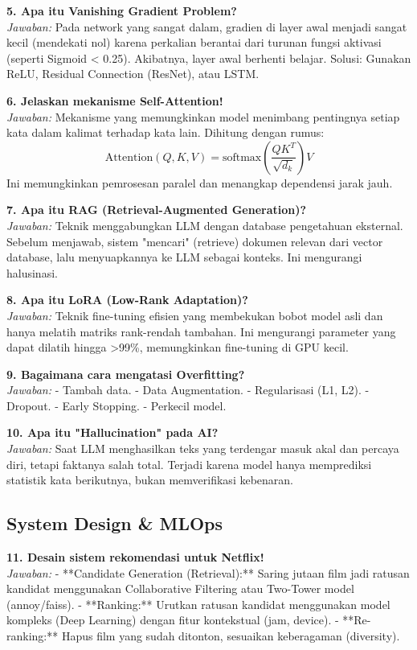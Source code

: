 \textbf{5. Apa itu Vanishing Gradient Problem?} \\
\textit{Jawaban:} Pada network yang sangat dalam, gradien di layer awal menjadi sangat kecil (mendekati nol) karena perkalian berantai dari turunan fungsi aktivasi (seperti Sigmoid < 0.25). Akibatnya, layer awal berhenti belajar. Solusi: Gunakan ReLU, Residual Connection (ResNet), atau LSTM.

\textbf{6. Jelaskan mekanisme Self-Attention!} \\
\textit{Jawaban:} Mekanisme yang memungkinkan model menimbang pentingnya setiap kata dalam kalimat terhadap kata lain. Dihitung dengan rumus:
\[ \text{Attention}(Q, K, V) = \text{softmax}\left(\frac{QK^T}{\sqrt{d_k}}\right)V \]
Ini memungkinkan pemrosesan paralel dan menangkap dependensi jarak jauh.

\textbf{7. Apa itu RAG (Retrieval-Augmented Generation)?} \\
\textit{Jawaban:} Teknik menggabungkan LLM dengan database pengetahuan eksternal. Sebelum menjawab, sistem "mencari" (retrieve) dokumen relevan dari vector database, lalu menyuapkannya ke LLM sebagai konteks. Ini mengurangi halusinasi.

\textbf{8. Apa itu LoRA (Low-Rank Adaptation)?} \\
\textit{Jawaban:} Teknik fine-tuning efisien yang membekukan bobot model asli dan hanya melatih matriks rank-rendah tambahan. Ini mengurangi parameter yang dapat dilatih hingga >99\%, memungkinkan fine-tuning di GPU kecil.

\textbf{9. Bagaimana cara mengatasi Overfitting?} \\
\textit{Jawaban:}
- Tambah data.
- Data Augmentation.
- Regularisasi (L1, L2).
- Dropout.
- Early Stopping.
- Perkecil model.

\textbf{10. Apa itu "Hallucination" pada AI?} \\
\textit{Jawaban:} Saat LLM menghasilkan teks yang terdengar masuk akal dan percaya diri, tetapi faktanya salah total. Terjadi karena model hanya memprediksi statistik kata berikutnya, bukan memverifikasi kebenaran.

\subsection{System Design \& MLOps}

\textbf{11. Desain sistem rekomendasi untuk Netflix!} \\
\textit{Jawaban:}
- **Candidate Generation (Retrieval):** Saring jutaan film jadi ratusan kandidat menggunakan Collaborative Filtering atau Two-Tower model (annoy/faiss).
- **Ranking:** Urutkan ratusan kandidat menggunakan model kompleks (Deep Learning) dengan fitur kontekstual (jam, device).
- **Re-ranking:** Hapus film yang sudah ditonton, sesuaikan keberagaman (diversity).

